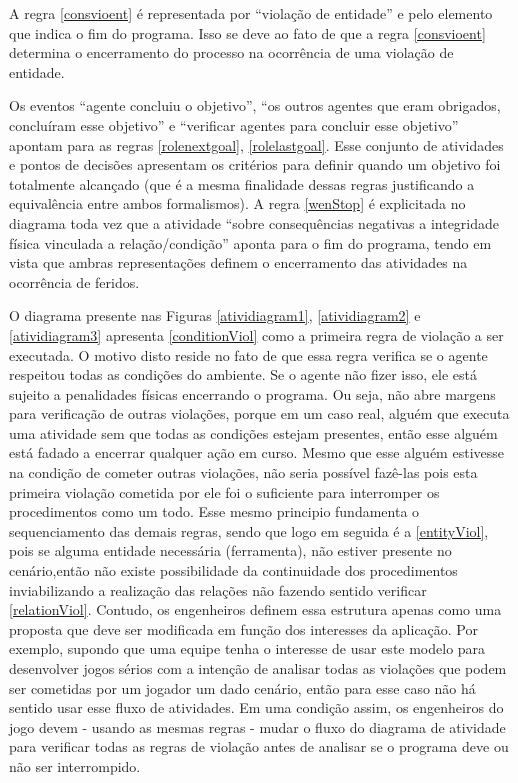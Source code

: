 A regra \ref{consvioent} é representada por ``violação de entidade'' e pelo elemento que indica o fim do programa. Isso se deve ao fato de que a regra \ref{consvioent} determina o encerramento do processo na ocorrência de uma violação de entidade. 

Os eventos ``agente concluiu o objetivo'', ``os outros agentes que eram obrigados, concluíram esse objetivo'' e ``verificar agentes para concluir esse objetivo'' apontam para as regras \ref{rolenextgoal}, \ref{rolelastgoal}. Esse conjunto de atividades e pontos de decisões apresentam os critérios para definir quando um objetivo foi totalmente alcançado (que é a mesma finalidade dessas regras justificando a equivalência entre ambos formalismos).  A regra \ref{wenStop} é explicitada no diagrama toda vez que a atividade ``sobre consequências negativas a integridade física vinculada  a relação/condição'' aponta para o fim do programa, tendo em vista que ambras representações definem o encerramento das atividades na ocorrência de feridos. 

O diagrama presente nas Figuras \ref{atividiagram1}, \ref{atividiagram2} e \ref{atividiagram3} apresenta \ref{conditionViol} como a primeira regra de violação a ser executada. O motivo disto reside no fato de que essa regra verifica se o agente respeitou todas as condições do ambiente. Se o agente não fizer isso, ele está sujeito a penalidades físicas encerrando o programa. Ou seja, não abre margens para verificação de outras violações, porque em um caso real, alguém que executa uma atividade sem que todas as condições estejam presentes, então esse alguém está fadado a encerrar qualquer ação em curso. Mesmo que esse alguém estivesse na condição de cometer outras violações, não seria possível fazê-las pois esta primeira violação cometida por ele foi o suficiente para interromper os procedimentos como um todo. Esse mesmo principio fundamenta o sequenciamento das demais regras, sendo que logo em seguida é a \ref{entityViol}, pois se alguma entidade  necessária (ferramenta), não estiver presente no cenário,então não existe possibilidade da continuidade dos procedimentos inviabilizando a realização das relações não fazendo sentido verificar \ref{relationViol}. Contudo, os engenheiros definem essa estrutura apenas como uma proposta que deve ser modificada em função dos interesses da aplicação. Por exemplo, supondo que uma equipe tenha o interesse de usar este modelo para desenvolver jogos sérios com a intenção de analisar todas as violações que podem ser cometidas por um jogador um dado cenário, então para esse caso não há sentido usar esse fluxo de atividades. Em uma condição assim, os engenheiros do jogo devem - usando as mesmas regras - mudar o fluxo do diagrama de atividade para verificar todas as regras de violação antes de analisar se o programa deve ou não ser interrompido.